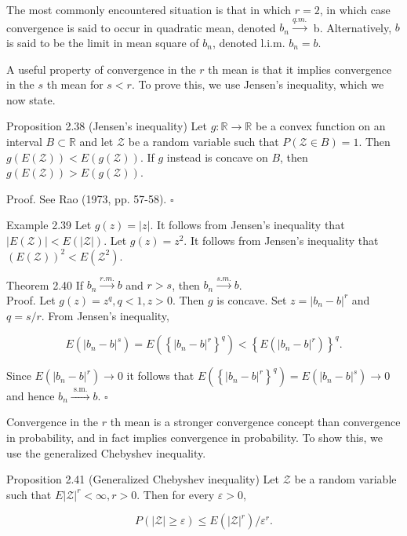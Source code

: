 \documentclass[10pt]{article}
\begin{document}
The most commonly encountered situation is that in which $r=2$, in which case convergence is said to occur in quadratic mean, denoted $b_{n} \xrightarrow{q . m .}$ b. Alternatively, $b$ is said to be the limit in mean square of $b_{n}$, denoted l.i.m. $b_{n}=b$.

A useful property of convergence in the $r$ th mean is that it implies convergence in the $s$ th mean for $s<r$. To prove this, we use Jensen's inequality, which we now state.

Proposition 2.38 (Jensen's inequality) Let $g: \mathbb{R} \rightarrow \mathbb{R}$ be a convex function on an interval $B \subset \mathbb{R}$ and let $\mathcal{Z}$ be a random variable such that $P(\mathcal{Z} \in B)=1$. Then $g(E(\mathcal{Z}))<E(g(\mathcal{Z}))$. If $g$ instead is concave on $B$, then $g(E(\mathcal{Z}))>E(g(\mathcal{Z}))$.

Proof. See Rao (1973, pp. 57-58). \(\square\)

Example 2.39 Let $g(z)=|z|$. It follows from Jensen's inequality that $|E(\mathcal{Z})|<E(|\mathcal{Z}|)$. Let $g(z)=z^{2}$. It follows from Jensen's inequality that $(E(\mathcal{Z}))^{2}<E\left(\mathcal{Z}^{2}\right)$.

Theorem 2.40 If $b_{n} \xrightarrow{r . m .} b$ and $r>s$, then $b_{n} \xrightarrow{s . m .} b$.\\
Proof. Let $g(z)=z^{q}, q<1, z>0$. Then $g$ is concave. Set $z=\left|b_{n}-b\right|^{r}$ and $q=s / r$. From Jensen's inequality,

$$
E\left(\left|b_{n}-b\right|^{s}\right)=E\left(\left\{\left|b_{n}-b\right|^{r}\right\}^{q}\right)<\left\{E\left(\left|b_{n}-b\right|^{r}\right)\right\}^{q} .
$$

Since $E\left(\left|b_{n}-b\right|^{r}\right) \rightarrow 0$ it follows that $E\left(\left\{\left|b_{n}-b\right|^{r}\right\}^{q}\right)=E\left(\left|b_{n}-b\right|^{s}\right) \rightarrow 0$ and hence $b_{n} \xrightarrow{\text { s.m. }} b$. \(\square\)

Convergence in the $r$ th mean is a stronger convergence concept than convergence in probability, and in fact implies convergence in probability. To show this, we use the generalized Chebyshev inequality.

Proposition 2.41 (Generalized Chebyshev inequality) Let $\mathcal{Z}$ be a random variable such that $E|\mathcal{Z}|^{r}<\infty, r>0$. Then for every $\varepsilon>0$,

$$
P(|\mathcal{Z}| \geq \varepsilon) \leq E\left(|\mathcal{Z}|^{r}\right) / \varepsilon^{r} .
$$
\end{document}
